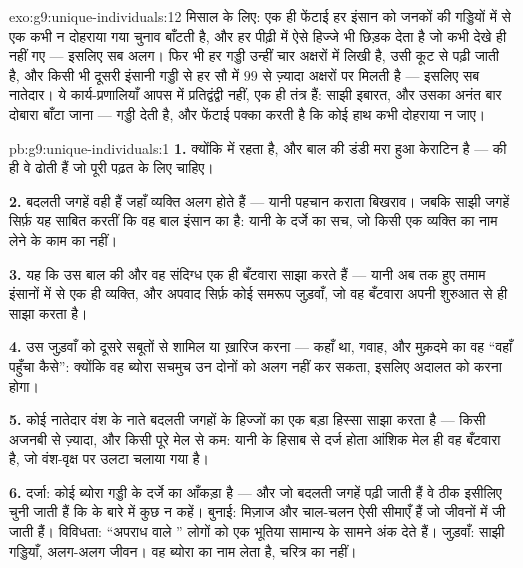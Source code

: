 \begin{solution}{exo:g9:unique-individuals:12}
मिसाल के लिए: एक ही फेंटाई हर इंसान को जनकों की गड्डियों में से एक कभी न
दोहराया गया चुनाव बाँटती है, और  हर पीढ़ी में ऐसे हिज्जे भी
छिड़क देता है जो कभी देखे ही नहीं गए --- इसलिए सब अलग। फिर भी हर गड्डी
उन्हीं चार अक्षरों में लिखी है, उसी कूट से पढ़ी जाती है, और किसी भी दूसरी
इंसानी गड्डी से हर सौ में $99$ से ज़्यादा अक्षरों पर मिलती है --- इसलिए
सब नातेदार। ये कार्य-प्रणालियाँ आपस में प्रतिद्वंद्वी नहीं, एक ही तंत्र
हैं: साझी इबारत, और उसका अनंत बार दोबारा बाँटा जाना ---  गड्डी
देती है, और फेंटाई पक्का करती है कि कोई हाथ कभी दोहराया न जाए।
\end{solution}

\begin{solution}{pb:g9:unique-individuals:1}
\textbf{1.} क्योंकि   में रहता है, और बाल की डंडी मरा हुआ
केराटिन है ---  की  ही वे  ढोती हैं जो पूरी पढ़त के लिए
चाहिए।

\textbf{2.} बदलती जगहें वही हैं जहाँ व्यक्ति अलग होते हैं --- यानी
पहचान कराता बिखराव। जबकि साझी जगहें सिर्फ़ यह साबित करतीं कि वह बाल
इंसान का है: यानी  के दर्जे का सच, जो किसी एक व्यक्ति का नाम
लेने के काम का नहीं।

\textbf{3.} यह कि उस बाल की  और वह संदिग्ध एक ही बँटवारा साझा
करते हैं --- यानी अब तक हुए तमाम इंसानों में से एक ही व्यक्ति, और अपवाद
सिर्फ़ कोई समरूप जुड़वाँ, जो वह बँटवारा अपनी शुरुआत से ही साझा करता है।

\textbf{4.} उस जुड़वाँ को दूसरे सबूतों से शामिल या ख़ारिज करना ---
कहाँ था, गवाह, और मुक़दमे का वह ``वहाँ पहुँचा कैसे'': क्योंकि वह ब्योरा
सचमुच उन दोनों को अलग नहीं कर सकता, इसलिए अदालत को करना होगा।

\textbf{5.} कोई नातेदार वंश के नाते बदलती जगहों के हिज्जों का एक बड़ा
हिस्सा साझा करता है --- किसी अजनबी से ज़्यादा, और किसी पूरे मेल से कम:
यानी  के हिसाब से दर्ज होता आंशिक मेल ही वह बँटवारा है, जो
वंश-वृक्ष पर उलटा चलाया गया है।

\textbf{6.} दर्जा: कोई ब्योरा गड्डी के दर्जे का आँकड़ा है --- और जो
बदलती जगहें पढ़ी जाती हैं वे ठीक इसीलिए चुनी जाती हैं कि  के बारे
में कुछ न कहें। बुनाई: मिज़ाज और चाल-चलन ऐसी सीमाएँ हैं जो जीवनों में जी
जाती हैं। विविधता: ``अपराध वाले '' लोगों को एक भूतिया सामान्य के
सामने अंक देते हैं। जुड़वाँ: साझी गड्डियाँ, अलग-अलग जीवन। वह ब्योरा
 का नाम लेता है, चरित्र का नहीं।


\end{solution}
